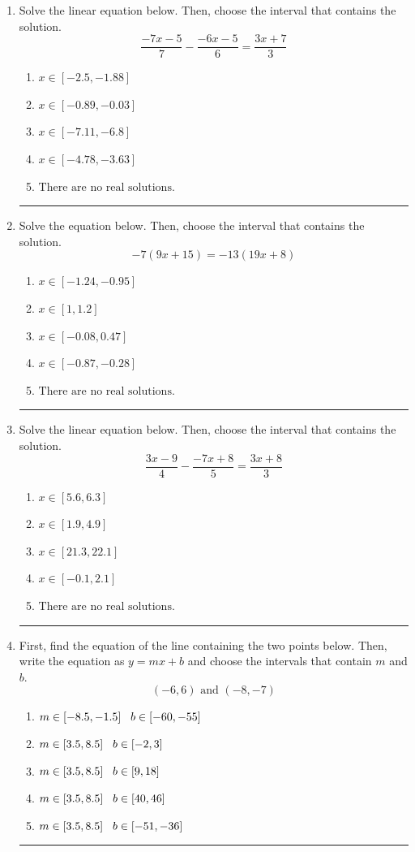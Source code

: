\documentclass[14pt]{extbook}
\newcommand{\litem}[1]{\item#1\hspace*{-1cm}\rule{\textwidth}{0.4pt}}
\begin{document}
\begin{enumerate}
{\begin{enumerate}[label=\Alph*.]
\end{enumerate} }
\litem{
Solve the linear equation below. Then, choose the interval that contains the solution.\[ \frac{-7x -5}{7} - \frac{-6x -5}{6} = \frac{3x + 7}{3} \]\begin{enumerate}[label=\Alph*.]
\item \( x \in [-2.5, -1.88] \)
\item \( x \in [-0.89, -0.03] \)
\item \( x \in [-7.11, -6.8] \)
\item \( x \in [-4.78, -3.63] \)
\item \( \text{There are no real solutions.} \)

\end{enumerate} }
\litem{
Solve the equation below. Then, choose the interval that contains the solution.\[ -7(9x + 15) = -13(19x + 8) \]\begin{enumerate}[label=\Alph*.]
\item \( x \in [-1.24, -0.95] \)
\item \( x \in [1, 1.2] \)
\item \( x \in [-0.08, 0.47] \)
\item \( x \in [-0.87, -0.28] \)
\item \( \text{There are no real solutions.} \)

\end{enumerate} }
\litem{
Solve the linear equation below. Then, choose the interval that contains the solution.\[ \frac{3x -9}{4} - \frac{-7x + 8}{5} = \frac{3x + 8}{3} \]\begin{enumerate}[label=\Alph*.]
\item \( x \in [5.6, 6.3] \)
\item \( x \in [1.9, 4.9] \)
\item \( x \in [21.3, 22.1] \)
\item \( x \in [-0.1, 2.1] \)
\item \( \text{There are no real solutions.} \)

\end{enumerate} }
\litem{
First, find the equation of the line containing the two points below. Then, write the equation as $ y=mx+b $ and choose the intervals that contain $m$ and $b$.\[ (-6, 6) \text{ and } (-8, -7) \]\begin{enumerate}[label=\Alph*.]
\item \( m \in [-8.5, -1.5] \hspace*{3mm} b \in [-60, -55] \)
\item \( m \in [3.5, 8.5] \hspace*{3mm} b \in [-2, 3] \)
\item \( m \in [3.5, 8.5] \hspace*{3mm} b \in [9, 18] \)
\item \( m \in [3.5, 8.5] \hspace*{3mm} b \in [40, 46] \)
\item \( m \in [3.5, 8.5] \hspace*{3mm} b \in [-51, -36] \)

\end{enumerate} }
\end{enumerate}
\end{document}
